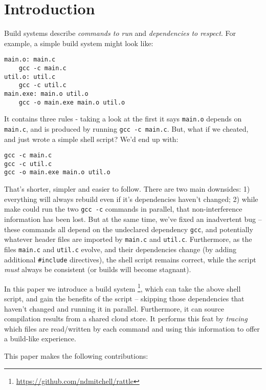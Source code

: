 \section{Introduction}
\label{sec:introduction}

Build systems \citep{build_systems_a_la_carte} describe \emph{commands to run} and \emph{dependencies to respect}. For example, a simple \Make build system might look like:

\begin{verbatim}
main.o: main.c
    gcc -c main.c
util.o: util.c
    gcc -c util.c
main.exe: main.o util.o
    gcc -o main.exe main.o util.o
\end{verbatim}

It contains three rules - taking a look at the first it says \texttt{main.o} depends on \texttt{main.c}, and is produced by running \texttt{gcc -c main.c}. But, what if we cheated, and just wrote a simple shell script? We'd end up with:

\begin{verbatim}
gcc -c main.c
gcc -c util.c
gcc -o main.exe main.o util.o
\end{verbatim}

That's shorter, simpler and easier to follow. There are two main downsides: 1) everything will always rebuild even if it's dependencies haven't changed; 2) while make could run the two \texttt{gcc -c} commands in parallel, that non-interference information has been lost. But at the same time, we've fixed an inadvertent bug -- these commands all depend on the undeclared dependency \texttt{gcc}, and potentially whatever header files are imported by \texttt{main.c} and \texttt{util.c}. Furthermore, as the files \texttt{main.c} and \texttt{util.c} evolve, and their dependencies change (by adding additional \texttt{\#include} directives), the shell script remains correct, while the \Make script \emph{must} always be consistent (or builds will become stagnant).

In this paper we introduce a build system \Rattle\footnote{\url{https://github.com/ndmitchell/rattle}}, which can take the above shell script, and gain the benefits of the \Make script -- skipping those dependencies that haven't changed and running it in parallel. Furthermore, it can source compilation results from a shared cloud store. It performs this feat by \emph{tracing} which files are read/written by each command and using this information to offer a build-like experience.

This paper makes the following contributions:

